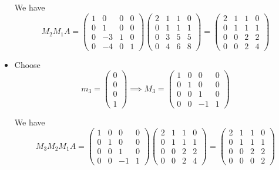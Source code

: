 \begin{example}
\begin{itemize}
              We have \[
                  M_2 M_1 A
                  =
                  \begin{pmatrix}
                      1 & 0 & 0 & 0 \\ 0 & 1 & 0 & 0 \\ 0 & -3 & 1 & 0 \\ 0 & -4 & 0 & 1
                  \end{pmatrix}
                  \begin{pmatrix}
                      2 & 1 & 1 & 0 \\ 0 & 1 & 1 & 1 \\ 0 & 3 & 5 & 5 \\ 0 & 4 & 6 & 8
                  \end{pmatrix}
                  =
                  \begin{pmatrix}
                      2 & 1 & 1 & 0 \\ 0 & 1 & 1 & 1 \\ 0 & 0 & 2 & 2 \\ 0 & 0 & 2 & 4
                  \end{pmatrix}
              \]

        \item Choose \[
                  m_3 = \begin{pmatrix}
                      0 \\ 0 \\ 0 \\ 1
                  \end{pmatrix}
                  \implies
                  M_3 = \begin{pmatrix}
                      1 & 0 & 0 & 0 \\ 0 & 1 & 0 & 0 \\ 0 & 0 & 1 & 0 \\ 0 & 0 & -1 & 1
                  \end{pmatrix}
              \]

              We have \[
                  M_3 M_2 M_1 A
                  =
                  \begin{pmatrix}
                      1 & 0 & 0 & 0 \\ 0 & 1 & 0 & 0 \\ 0 & 0 & 1 & 0 \\ 0 & 0 & -1 & 1
                  \end{pmatrix}
                  \begin{pmatrix}
                      2 & 1 & 1 & 0 \\ 0 & 1 & 1 & 1 \\ 0 & 0 & 2 & 2 \\ 0 & 0 & 2 & 4
                  \end{pmatrix}
                  =
                  \begin{pmatrix}
                      2 & 1 & 1 & 0 \\ 0 & 1 & 1 & 1 \\ 0 & 0 & 2 & 2 \\ 0 & 0 & 0 & 2
                  \end{pmatrix}
              \]
    \end{itemize}


\end{example}

